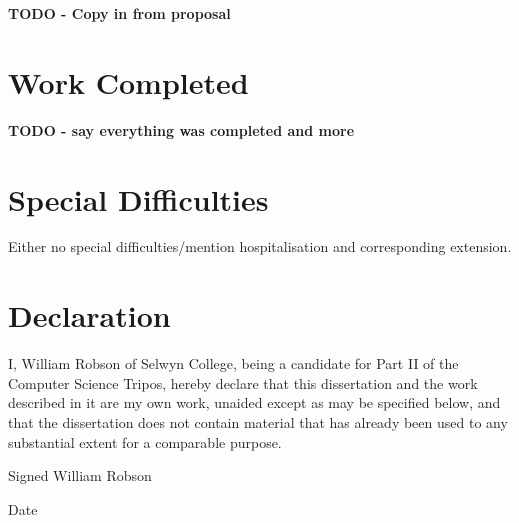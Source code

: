 \textbf{TODO - Copy in from proposal}

\section*{Work Completed}

\textbf{TODO - say everything was completed and more}

\section*{Special Difficulties}

Either no special difficulties/mention hospitalisation and corresponding extension.

\pagebreak

\section*{Declaration}

I, William Robson of Selwyn College, being a candidate for Part II of the Computer Science Tripos,
hereby declare that this dissertation and the work described in it are my own work, unaided except
as may be specified below, and that the dissertation does not contain material that has already
been used to any substantial extent for a comparable purpose.

Signed William Robson

Date \thedate

\cleardoublepage

\tableofcontents

\newpage




\cleardoublepage
\setcounter{page}{1}
\pagestyle{headings}